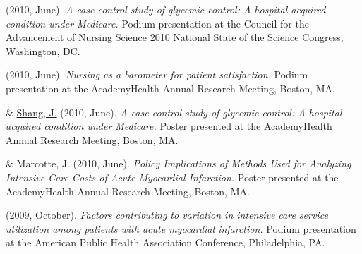 \documentclass[10pt,]{article}
\begin{document}
{{{{{{{{{{{{{{{\begin{hangparas}{.25in}{1}
 (2010, June). {\textit {A case-control study of glycemic control: A hospital-acquired condition under Medicare.}} Podium presentation at the Council for the Advancement of Nursing Science 2010 National State of the Science Congress, Washington, DC.

\end{hangparas}

\vspace{4mm}

\begin{hangparas}{.25in}{1}

 (2010, June). {\textit {Nursing as a barometer for patient satisfaction.}} Podium presentation at the AcademyHealth Annual Research Meeting, Boston, MA.

\end{hangparas}

\vspace{4mm}

\begin{hangparas}{.25in}{1}

 \& {\underline {Shang, J.}} (2010, June). {\textit {A case-control study of glycemic control: A hospital-acquired condition under Medicare.}} Poster presented at the AcademyHealth Annual Research Meeting, Boston, MA.

\end{hangparas}

\vspace{4mm}

\begin{hangparas}{.25in}{1}

 \& Marcotte, J. (2010, June). {\textit {Policy Implications of Methods Used for Analyzing Intensive Care Costs of Acute Myocardial Infarction.}} Poster presented at the AcademyHealth Annual Research Meeting, Boston, MA.

\end{hangparas}

\vspace{4mm}

\begin{hangparas}{.25in}{1}

 (2009, October). {\textit {Factors contributing to variation in intensive care service utilization among patients with acute myocardial infarction.}} Podium presentation at the American Public Health Association Conference, Philadelphia, PA.


\end{hangparas}}}}}}}}}}}}}}}}
\end{document}
